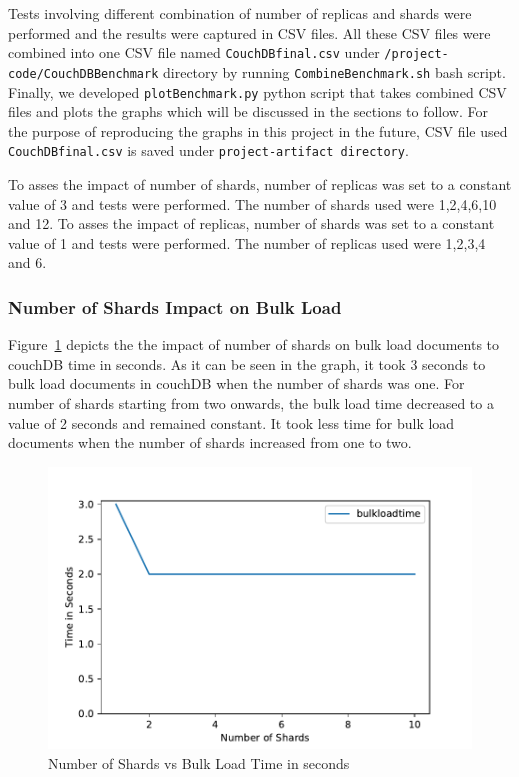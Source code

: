 Tests involving different combination of number of replicas and shards
were performed and the results were captured in CSV files. All these
CSV files were combined into one CSV file named
\verb|CouchDBfinal.csv| under \verb|/project-code/CouchDBBenchmark|
directory by running \verb|CombineBenchmark.sh| bash script. Finally,
we developed \verb|plotBenchmark.py| python script that takes combined
CSV files and plots the graphs which will be discussed in the sections
to follow. For the purpose of reproducing the graphs in this project
in the future, CSV file used \verb|CouchDBfinal.csv| is saved under
\verb|project-artifact directory|.

To asses the impact of number of shards, number of replicas was set to a
constant value of 3 and tests were performed. The number of shards
used were 1,2,4,6,10 and 12. To asses the impact of replicas, number
of shards was set to a constant value of 1 and tests were
performed. The number of replicas used were 1,2,3,4 and 6.



\subsubsection{Number of Shards Impact on Bulk Load}


Figure~\ref{f:shard-bulk} depicts the the impact of number of shards
on bulk load documents to couchDB time in seconds. As it can be seen
in the graph, it took 3 seconds to bulk load documents in couchDB when
the number of shards was one. For number of shards starting from two
onwards, the bulk load time decreased to a value of 2 seconds and
remained constant. It took less time for bulk load documents when the
number of shards increased from one to two.

\begin{figure}[!ht]
  \centering\includegraphics[width=\columnwidth]{../images/ShardsBulkLoad.pdf}
  \caption{Number of Shards vs Bulk Load Time in seconds }\label{f:shard-bulk}
\end{figure}



